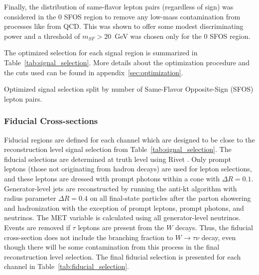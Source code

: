 Finally, the distribution of same-flavor lepton pairs (regardless of sign) was considered in the 0 SFOS 
region to remove any low-mass contamination from processes like from QCD.  This was shown to offer some
modest discriminating power and a threshold of $m_{SF} > 20$~GeV was chosen only for the 0 SFOS region.


The optimized selection for each signal region is summarized in Table~\ref{tab:signal_selection}.
More details about the optimization procedure and the cuts used 
can be found in appendix~\ref{sec:optimization}.

\begin{table}[ht!]
\centering
\begin{small}

\end{small}
\caption{Optimized signal selection split by number of Same-Flavor Opposite-Sign (SFOS) lepton pairs.}
\label{tab:signal_selection}
\end{table}

\clearpage
\subsubsection{Fiducial Cross-sections}
\label{sec:fiducial_cross_section}


Fiducial regions are defined for each channel which are designed to be close to the reconstruction
level signal selection from Table~\ref{tab:signal_selection}.  
The fiducial selections are determined at truth level using Rivet \cite{Buckley:2010ar}.
Only prompt leptons (those not originating from hadron decays) are used for lepton selections, and these leptons are dressed with prompt photons within a cone with $\Delta R = 0.1$. Generator-level jets are reconstructed by running the anti-kt algorithm with radius parameter $\Delta R = 0.4$ on all final-state particles after the parton showering and hadronization with the exception of prompt leptons, prompt photons, and neutrinos. The MET variable is calculated using all generator-level neutrinos. 
Events are removed if $\tau$ leptons are present from the $W$ decays.  Thus, the fiducial cross-section
does not include the branching fraction to $W\rightarrow\tau\nu$ decay, even though there will be some contamination from this process in the final reconstruction level selection. The final fiducial selection is presented
for each channel in Table~\ref{tab:fiducial_selection}.


